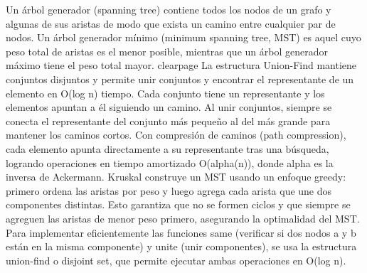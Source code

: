 \markdownRendererDocumentBegin
\markdownRendererSectionBegin
{}\markdownRendererInterblockSeparator
{}Un árbol generador (spanning tree) contiene todos los nodos de un grafo y algunas de sus aristas de modo que exista un camino entre cualquier par de nodos.\markdownRendererParagraphSeparator
{}Un árbol generador mínimo (minimum spanning tree, MST) es aquel cuyo peso total de aristas es el menor posible, mientras que un árbol generador máximo tiene el peso total mayor.\markdownRendererParagraphSeparator
{}\markdownRendererDollarSign{}\markdownRendererBackslash{}clearpage\markdownRendererDollarSign{}\markdownRendererInterblockSeparator
{}\markdownRendererSectionBegin
\markdownRendererSectionBegin
{}\markdownRendererInterblockSeparator
{}La estructura Union-Find mantiene conjuntos disjuntos y permite unir conjuntos y encontrar el representante de un elemento en \markdownRendererDollarSign{}O(\markdownRendererBackslash{}log n)\markdownRendererDollarSign{} tiempo.\markdownRendererParagraphSeparator
{}Cada conjunto tiene un representante y los elementos apuntan a él siguiendo un camino. Al unir conjuntos, siempre se conecta el representante del conjunto más pequeño al del más grande para mantener los caminos cortos.\markdownRendererParagraphSeparator
{}Con compresión de caminos (path compression), cada elemento apunta directamente a su representante tras una búsqueda, logrando operaciones en tiempo amortizado \markdownRendererDollarSign{}O(\markdownRendererBackslash{}alpha(n))\markdownRendererDollarSign{}, donde \markdownRendererDollarSign{}\markdownRendererBackslash{}alpha\markdownRendererDollarSign{} es la inversa de Ackermann.\markdownRendererParagraphSeparator
{}\markdownRendererParagraphSeparator
{}
\markdownRendererSectionEnd \markdownRendererSectionBegin
{}\markdownRendererInterblockSeparator
{}Kruskal construye un MST usando un enfoque greedy: primero ordena las aristas por peso y luego agrega cada arista que une dos componentes distintas. Esto garantiza que no se formen ciclos y que siempre se agreguen las aristas de menor peso primero, asegurando la optimalidad del MST.\markdownRendererParagraphSeparator
{}Para implementar eficientemente las funciones same (verificar si dos nodos \markdownRendererDollarSign{}a\markdownRendererDollarSign{} y \markdownRendererDollarSign{}b\markdownRendererDollarSign{} están en la misma componente) y unite (unir componentes), se usa la estructura union-find o disjoint set, que permite ejecutar ambas operaciones en \markdownRendererDollarSign{}O(\markdownRendererBackslash{}log n)\markdownRendererDollarSign{}.\markdownRendererHardLineBreak
